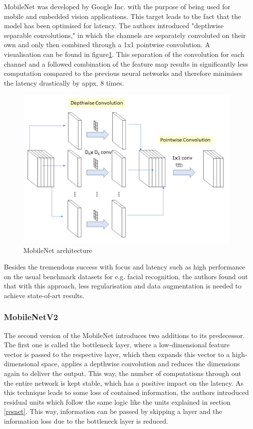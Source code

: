 MobileNet was developed by Google Inc. with the purpose of being used for mobile and embedded vision applications. This target leads to the fact that the model has been optimised for latency.
The authors introduced "depthwise separable convolutions," in which the channels are separately convoluted on their own and only then combined through a 1x1 pointwise convolution\cite{howard2017mobilenets}. A visualisation can be found in figure\ref{fig:mobilenet}. This separation of the convolution for each channel and a followed combination of the feature map results in significantly less computation compared to the previous neural networks and therefore minimises the latency drastically by appx. 8 times\cite{howard2017mobilenets}.

\begin{figure}[ht]
  \centering
  \includegraphics[width=\linewidth]{figures/mobilenet.png}
  \caption{MobileNet architecture}
  \label{fig:mobilenet}
\end{figure}

Besides the tremendous success with focus and latency such as high performance on the usual benchmark datasets for e.g. facial recognition, the authors found out that with this approach, less regularisation and data augmentation is needed to achieve state-of-art results.

\subsubsection{MobileNetV2}
The second version of the MobileNet introduces two additions to its predecessor. The first one is called the bottleneck layer, where a low-dimensional feature vector is passed to the respective layer, which then expands this vector to a high-dimensional space, applies a depthwise convolution and reduces the dimensions again to deliver the output\cite{sandler2019mobilenetv2}. This way, the number of computations through out the entire network is kept stable, which has a positive impact on the latency. As this technique leads to some loss of contained information, the authors introduced residual units which follow the same logic like the units explained in section \ref{resnet}. This way, information can be passed by skipping a layer and the information loss due to the bottleneck layer is reduced.

